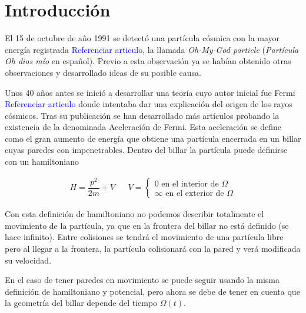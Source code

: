 %
%

\chapter{Introducción}

El 15 de octubre de año 1991 se detectó una partícula cósmica con la mayor energía registrada \textcolor{blue}{Referenciar articulo}, la llamada \textit{Oh-My-God particle}\cite{OhMyParticle} (\textit{Partícula Oh dios mío} en español). Previo a esta observación ya se habían obtenido otras observaciones y desarrollado ideas de su posible causa.

\vspace{3mm}

Unos 40 años antes se inició a desarrollar una teoría cuyo autor inicial fue Fermi \cite{Fermi} \textcolor{blue}{Referenciar articulo} donde intentaba dar una explicación del origen de los rayos cósmicos. Tras su publicación se han desarrollado más artículos probando la existencia de la denominada Aceleración de Fermi. Esta aceleración se define como el gran aumento de energía que obtiene una partícula encerrada en un billar cuyas paredes con impenetrables. Dentro del billar la partícula puede definirse con un hamiltoniano

\begin{align}
    H = \dfrac{p^2}{2m} + V & & V = \begin{cases}
        0 \text{ en el interior de } \Omega \\
        \infty \text{ en el exterior de } \Omega
    \end{cases}
\end{align}

\vspace{3mm}

Con esta definición de hamiltoniano no podemos describir totalmente el movimiento de la partícula, ya que en la frontera del billar no está definido (se hace infinito). Entre colisiones se tendrá el movimiento de una partícula libre pero al llegar a la frontera, la partícula colisionará con la pared y verá modificada su velocidad. 

\vspace{3mm}

En el caso de tener paredes en movimiento se puede seguir usando la misma definición de hamiltoniano y potencial, pero ahora se debe de tener en cuenta que la geometría del billar depende del tiempo \( \Omega(t) \).

